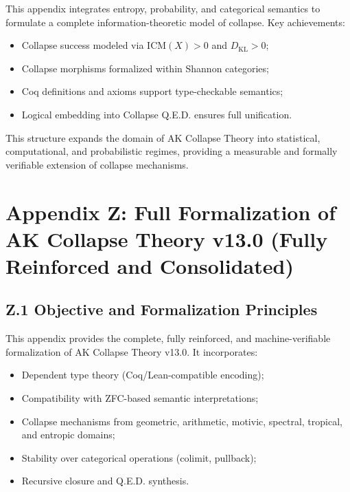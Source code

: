 \documentclass[11pt]{article}
\begin{document}
This appendix integrates entropy, probability, and categorical semantics to formulate a complete information-theoretic model of collapse. Key achievements:

\begin{itemize}
    \item Collapse success modeled via \( \mathrm{ICM}(X) > 0 \) and \( D_{\mathrm{KL}} > 0 \);
    \item Collapse morphisms formalized within Shannon categories;
    \item Coq definitions and axioms support type-checkable semantics;
    \item Logical embedding into Collapse Q.E.D. ensures full unification.
\end{itemize}

This structure expands the domain of AK Collapse Theory into statistical, computational, and probabilistic regimes, providing a measurable and formally verifiable extension of collapse mechanisms.




\section*{Appendix Z: Full Formalization of AK Collapse Theory v13.0 (Fully Reinforced and Consolidated)}

\subsection*{Z.1 Objective and Formalization Principles}

This appendix provides the complete, fully reinforced, and machine-verifiable formalization of AK Collapse Theory v13.0. It incorporates:

\begin{itemize}
    \item Dependent type theory (Coq/Lean-compatible encoding);
    \item Compatibility with ZFC-based semantic interpretations;
    \item Collapse mechanisms from geometric, arithmetic, motivic, spectral, tropical, and entropic domains;
    \item Stability over categorical operations (colimit, pullback);
    \item Recursive closure and Q.E.D. synthesis.
\end{itemize}
\end{document}
